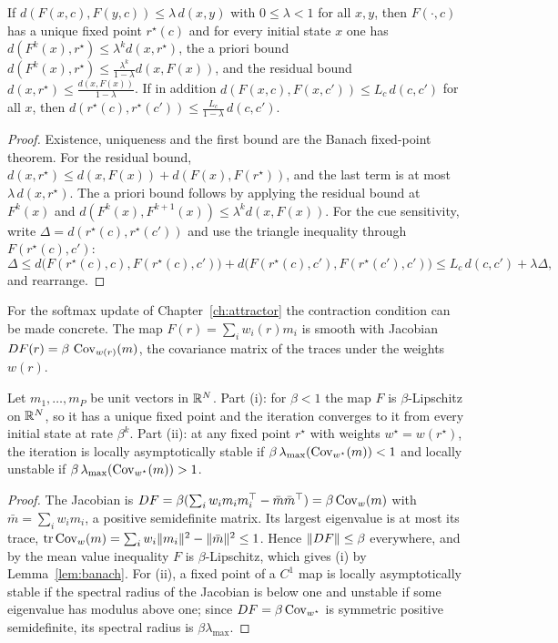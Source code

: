 \begin{lemma}\label{lem:banach}
If $d(F(x,c),F(y,c))\le\lambda\,d(x,y)$ with $0\le\lambda<1$ for all $x,y$, then $F(\cdot,c)$ has a unique fixed point $r^\star(c)$ and for every initial state $x$ one has $d(F^k(x),r^\star)\le\lambda^kd(x,r^\star)$, the a priori bound $d(F^k(x),r^\star)\le\frac{\lambda^k}{1-\lambda}d(x,F(x))$, and the residual bound $d(x,r^\star)\le\frac{d(x,F(x))}{1-\lambda}$. If in addition $d(F(x,c),F(x,c'))\le L_c\,d(c,c')$ for all $x$, then $d(r^\star(c),r^\star(c'))\le\frac{L_c}{1-\lambda}\,d(c,c')$.
\end{lemma}

\begin{proof}
Existence, uniqueness and the first bound are the Banach fixed-point theorem. For the residual bound, $d(x,r^\star)\le d(x,F(x))+d(F(x),F(r^\star))$, and the last term is at most $\lambda\,d(x,r^\star)$. The a priori bound follows by applying the residual bound at $F^k(x)$ and $d(F^k(x),F^{k+1}(x))\le\lambda^kd(x,F(x))$. For the cue sensitivity, write $\Delta=d(r^\star(c),r^\star(c'))$ and use the triangle inequality through $F(r^\star(c),c')$:
\begin{equation*}
\Delta\le d\bigl(F(r^\star(c),c),F(r^\star(c),c')\bigr)+d\bigl(F(r^\star(c),c'),F(r^\star(c'),c')\bigr)\le L_c\,d(c,c')+\lambda\Delta,
\end{equation*}
and rearrange.
\end{proof}

For the softmax update of Chapter~\ref{ch:attractor} the contraction condition can be made concrete. The map $F(r)=\sum_iw_i(r)m_i$ is smooth with Jacobian $DF(r)=\beta\,\operatorname{Cov}_{w(r)}(m)$, the covariance matrix of the traces under the weights $w(r)$.

\begin{theorem}\label{thm:contract}
Let $m_1,\dots,m_P$ be unit vectors in $\mathbb{R}^N$.
Part (i): for $\beta<1$ the map $F$ is $\beta$-Lipschitz on $\mathbb{R}^N$, so it has a unique fixed point and the iteration converges to it from every initial state at rate $\beta^k$. Part (ii): at any fixed point $r^\star$ with weights $w^\star=w(r^\star)$, the iteration is locally asymptotically stable if $\beta\,\lambda_{\max}(\operatorname{Cov}_{w^\star}(m))<1$ and locally unstable if $\beta\,\lambda_{\max}(\operatorname{Cov}_{w^\star}(m))>1$.
\end{theorem}

\begin{proof}
The Jacobian is $DF=\beta(\sum_iw_im_im_i^\top-\bar m\bar m^\top)=\beta\operatorname{Cov}_w(m)$ with $\bar m=\sum_iw_im_i$, a positive semidefinite matrix. Its largest eigenvalue is at most its trace, $\operatorname{tr}\operatorname{Cov}_w(m)=\sum_iw_i\lVert m_i\rVert^2-\lVert \bar m\rVert^2\le1$. Hence $\lVert DF\rVert\le\beta$ everywhere, and by the mean value inequality $F$ is $\beta$-Lipschitz, which gives (i) by Lemma~\ref{lem:banach}. For (ii), a fixed point of a $C^1$ map is locally asymptotically stable if the spectral radius of the Jacobian is below one and unstable if some eigenvalue has modulus above one; since $DF=\beta\operatorname{Cov}_{w^\star}$ is symmetric positive semidefinite, its spectral radius is $\beta\lambda_{\max}$.
\end{proof}


